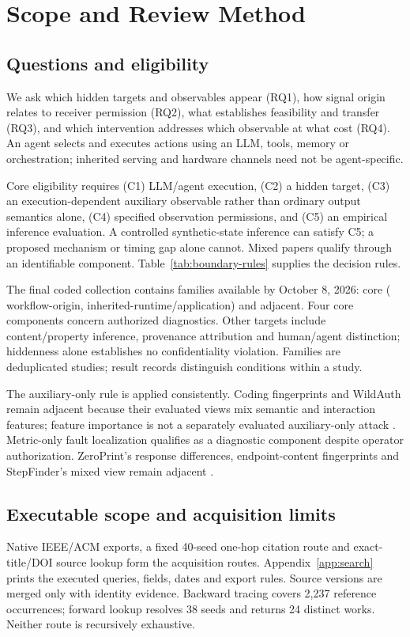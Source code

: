 \section{Scope and Review Method}\label{sec:methodology}\label{sec:background}
\subsection{Questions and eligibility}
We ask which hidden targets and observables appear (RQ1), how signal origin relates to receiver permission (RQ2), what establishes feasibility and transfer (RQ3), and which intervention addresses which observable at what cost (RQ4). An agent selects and executes actions using an LLM, tools, memory or orchestration; inherited serving and hardware channels need not be agent-specific.

Core eligibility requires (C1) LLM/agent execution, (C2) a hidden target, (C3) an execution-dependent auxiliary observable rather than ordinary output semantics alone, (C4) specified observation permissions, and (C5) an empirical inference evaluation. A controlled synthetic-state inference can satisfy C5; a proposed mechanism or timing gap alone cannot. Mixed papers qualify through an identifiable component. Table~\ref{tab:boundary-rules} supplies the decision rules.


The final coded collection contains \FinalN{} families available by October 8, 2026: \FinalCore{} core (\FinalA{} workflow-origin, \FinalB{} inherited-runtime/application) and \FinalAdjacent{} adjacent. Four core components concern authorized diagnostics. Other targets include content/property inference, provenance attribution and human/agent distinction; hiddenness alone establishes no confidentiality violation. Families are deduplicated studies; result records distinguish conditions within a study.

The auxiliary-only rule is applied consistently. Coding fingerprints and WildAuth remain adjacent because their evaluated views mix semantic and interaction features; feature importance is not a separately evaluated auxiliary-only attack \cite{ghaleb2026codingfingerprint,wang2026dialogue}. Metric-only fault localization qualifies as a diagnostic component despite operator authorization. ZeroPrint's response differences, endpoint-content fingerprints and StepFinder's mixed view remain adjacent \cite{scheinert2026rca,shao2026zeroprint,leshin2026endpoint,zhu2026stepfinder}.

\subsection{Executable scope and acquisition limits}
Native IEEE/ACM exports, a fixed 40-seed one-hop citation route and exact-title/DOI source lookup form the acquisition routes. Appendix~\ref{app:search} prints the executed queries, fields, dates and export rules. Source versions are merged only with identity evidence. Backward tracing covers 2,237 reference occurrences; forward lookup resolves 38 seeds and returns 24 distinct works. Neither route is recursively exhaustive.

